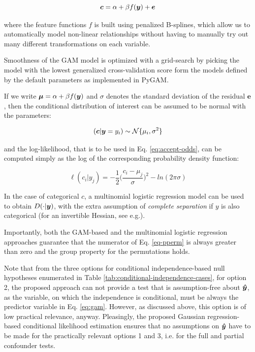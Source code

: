\documentclass{article}
\begin{document}
\begin{equation}
    \label{eq:gam}
    \boldsymbol{c} = \alpha + \beta f(\boldsymbol{y}) + \boldsymbol{e}
\end{equation}

where the feature functions $f$ is built using penalized B-splines, which allow us to automatically model non-linear relationships without having to manually try out many different transformations on each variable.

Smoothness of the GAM model is optimized with a grid-search by picking the model with the lowest generalized cross-validation score form the models defined by the default parameters as implemented in PyGAM\citep{serven2018generalized}.

If we write $\boldsymbol{\mu} = \alpha + \beta f(\boldsymbol{y})$ and $\sigma$ denotes the standard deviation of the residual $\boldsymbol{e}$, then the conditional distribution of interest can be assumed to be normal with the parameters:

$$ (\boldsymbol{c}|\boldsymbol{y}=y_i) \sim \mathcal{N}\{\mu_i, \sigma^2\}$$

and the log-likelihood, that is to be used in Eq. \ref{eq:accept-odds}, can be computed simply as the log of the corresponding probability density function:

$$ \ell(c_i|y_j) = - \frac{1}{2} \Big(\frac{c_i-\mu_j}{\sigma}\Big)^2 - ln(2 \pi \sigma)   $$

In the case of categorical $c$, a multinomial logistic regression model can be used to obtain $D(\cdot|\boldsymbol{y})$, with the extra assumption of \emph{complete separation} if $y$ is also categorical (for an invertible Hessian, see e.g.\citep{bennett1966multiple, jones1975proability}).

Importantly, both the GAM-based and the multinomial logistic regression approaches guarantee that the numerator of Eq. \ref{eq-pperm} is always greater than zero and the group property for the permutations holds.

Note that from the three options for conditional independence-based null hypotheses enumerated in Table \ref{tab:conditional-independence-cases}, for option 2, the proposed approach can not provide a test that is assumption-free about $\boldsymbol{\hat{y}}$, as the variable, on which the independence is conditional, must be always the predictor variable in Eq. \ref{eq:gam}. However, as discussed above, this option is of low practical relevance, anyway.
Pleasingly,  the proposed Gaussian regression-based conditional likelihood estimation ensures that no assumptions on $\boldsymbol{\hat{y}}$ have to be made for the practically relevant options 1 and 3, i.e. for the full and partial confounder tests.
\end{document}
